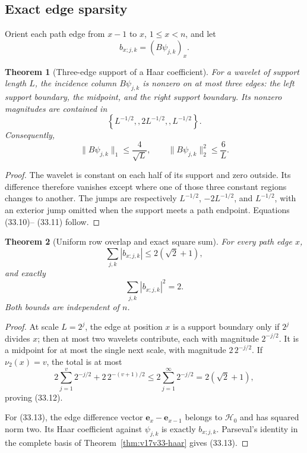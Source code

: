 \documentclass[11pt]{article}
\newtheorem{theorem}{Theorem}[section]
\theoremstyle{remark}
\begin{document}
\subsection{Exact edge sparsity}

Orient each path edge from \(x-1\) to \(x\), \(1\leq x<n\), and let
\[
 b_{x;j,k}=(B\psi_{j,k})_x.                        \tag{33.9}
\]

\begin{theorem}[Three-edge support of a Haar coefficient]
\label{thm:v17v33-column}
For a wavelet of support length \(L\), the incidence column
\(B\psi_{j,k}\) is nonzero on at most three edges: the left support
boundary, the midpoint, and the right support boundary.  Its nonzero
magnitudes are contained in
\[
 \left\{L^{-1/2},,2L^{-1/2},,L^{-1/2}\right\}.  \tag{33.10}
\]
Consequently,
\[
 \|B\psi_{j,k}\|_1\leq\frac4{\sqrt L},
 \qquad
 \|B\psi_{j,k}\|_2^2\leq\frac6L.                 \tag{33.11}
\]
\end{theorem}

\begin{proof}
The wavelet is constant on each half of its support and zero outside.
Its difference therefore vanishes except where one of those three
constant regions changes to another.  The jumps are respectively
\(L^{-1/2}\), \(-2L^{-1/2}\), and \(L^{-1/2}\), with an exterior jump
omitted when the support meets a path endpoint.  Equations (33.10)--
(33.11) follow.
\end{proof}

\begin{theorem}[Uniform row overlap and exact square sum]
\label{thm:v17v33-row}
For every path edge \(x\),
\[
 \sum_{j,k}|b_{x;j,k}|
 \leq2(\sqrt2+1),                                  \tag{33.12}
\]
and exactly
\[
 \boxed{\sum_{j,k}|b_{x;j,k}|^2=2.}               \tag{33.13}
\]
Both bounds are independent of \(n\).
\end{theorem}

\begin{proof}
At scale \(L=2^j\), the edge at position \(x\) is a support boundary
only if \(2^j\) divides \(x\); then at most two wavelets contribute,
each with magnitude \(2^{-j/2}\).  It is a midpoint for at most the
single next scale, with magnitude \(2\,2^{-j/2}\).  If
\(\nu_2(x)=v\), the total is at most
\[
 2\sum_{j=1}^{v}2^{-j/2}+2\,2^{-(v+1)/2}
 \leq2\sum_{j=1}^{\infty}2^{-j/2}
 =2(\sqrt2+1),                                     \tag{33.14}
\]
proving (33.12).

For (33.13), the edge difference vector
\(\mathbf e_x-\mathbf e_{x-1}\) belongs to \(\mathcal H_0\) and has
squared norm two.  Its Haar coefficient against \(\psi_{j,k}\) is
exactly \(b_{x;j,k}\).  Parseval's identity in the complete basis of
Theorem~\ref{thm:v17v33-haar} gives (33.13).
\end{proof}
\end{document}
